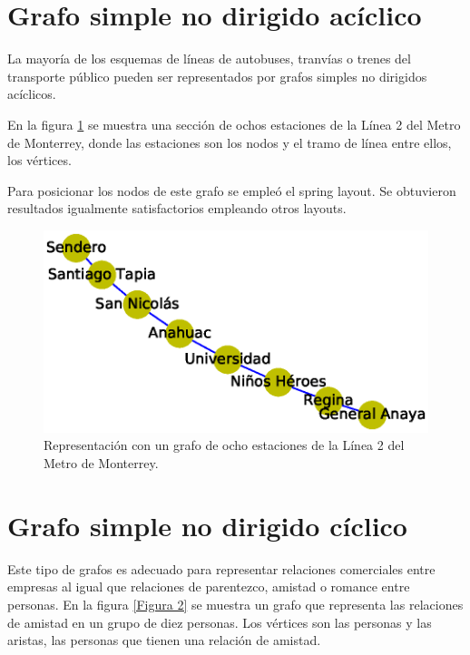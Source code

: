 \documentclass{article}
\begin{document}
\section{Grafo simple no dirigido acíclico}

La mayoría de los esquemas de líneas de autobuses, tranvías o trenes del transporte público pueden ser representados por grafos simples no dirigidos acíclicos.

En la figura  \ref{Figura 1} se muestra una sección de ochos estaciones de la Línea 2 del Metro de Monterrey, donde las estaciones son los nodos y el tramo de línea entre ellos, los vértices. 

Para posicionar los nodos de este grafo se empleó el spring layout. Se obtuvieron resultados igualmente satisfactorios empleando otros layouts.

\begin{figure}
\begin{center}
  \includegraphics[width=.7\columnwidth]{fig1.eps}
   \end{center}
  \caption{Representación con un grafo de ocho estaciones de la Línea 2 del Metro de Monterrey.}
  \label{Figura 1}
 
\end{figure}



\section{Grafo simple no dirigido cíclico}

Este tipo de grafos es adecuado para representar relaciones comerciales entre empresas al igual que relaciones de parentezco, amistad o romance entre personas.
En la figura \ref{Figura 2} se muestra un grafo que representa las relaciones de amistad en un grupo de diez personas. Los vértices son las personas y las aristas, las personas que tienen una relación de amistad.
\end{document}
